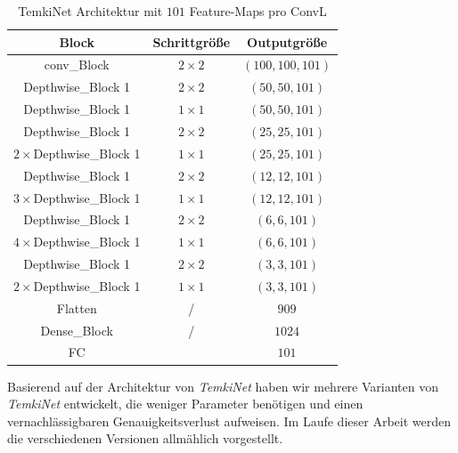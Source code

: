 \documentclass[12pt,a4paper]{scrartcl}
\numberwithin{equation}{section}
\begin{document}
\begin{table}[h!]
	\centering
	\begin{tabular}{|c|c|c|}
		\hline
		Block & Schrittgröße & Outputgröße\\ \hline
		conv\_Block &	$ 2\times2 $ &$ (100,100, 101) $\\ \hline
		Depthwise\_Block 1 & $ 2\times2 $&$ (50,50, 101) $\\ \hline
		Depthwise\_Block 1& $ 1\times1 $&$ (50,50, 101) $\\ \hline
		
		Depthwise\_Block 1 & $ 2\times2 $&$ (25,25, 101) $\\ \hline
		$ 2\times $Depthwise\_Block 1 & $ 1\times1 $&$ (25,25, 101) $\\ \hline
		
		Depthwise\_Block 1 & $ 2\times2 $&$ (12,12, 101) $\\ \hline
		$ 3\times $Depthwise\_Block 1 & $ 1\times1 $&$ (12,12, 101) $\\ \hline
		
		Depthwise\_Block 1 & $ 2\times2 $&$ (6,6, 101) $\\ \hline
		$ 4\times $Depthwise\_Block 1 & $ 1\times1 $&$ (6,6, 101) $\\ \hline
		
		Depthwise\_Block 1 & $ 2\times2 $&$ (3,3, 101) $\\ \hline
		$ 2\times $Depthwise\_Block 1& $ 1\times1 $&$ (3,3, 101) $\\ \hline
		Flatten & / &$ 909 $ \\ \hline
		Dense\_Block & / &$ 1024 $\\ \hline
		FC & & $ 101 $\\ \hline
		
	\end{tabular}
	\caption{TemkiNet Architektur mit $ 101 $ Feature-Maps pro \ac{ConvL}  }
	\label{tab:Temki_Architectur}
\end{table}

Basierend auf der Architektur von \textit{TemkiNet} haben wir mehrere Varianten von \textit{TemkiNet} entwickelt, die weniger Parameter benötigen und einen vernachlässigbaren Genauigkeitsverlust aufweisen.
Im Laufe dieser Arbeit werden die verschiedenen Versionen allmählich vorgestellt.
\end{document}
